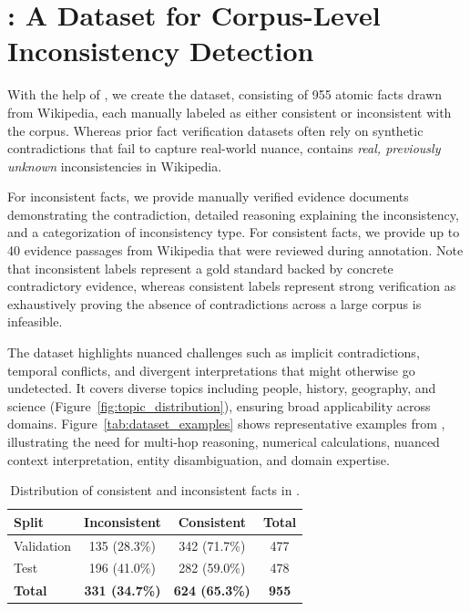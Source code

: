 \section{\dataset: A Dataset for Corpus-Level Inconsistency Detection}
\label{sec:dataset}

With the help of \system, we create the \dataset dataset, consisting of 955 atomic facts drawn from Wikipedia, each manually labeled as either consistent or inconsistent with the corpus. Whereas prior fact verification datasets often rely on synthetic contradictions that fail to capture real-world nuance, \dataset contains \emph{real, previously unknown} inconsistencies in Wikipedia.

For inconsistent facts, we provide manually verified evidence documents demonstrating the contradiction, detailed reasoning explaining the inconsistency, and a categorization of inconsistency type. For consistent facts, we provide up to 40 evidence passages from Wikipedia that were reviewed during annotation. Note that inconsistent labels represent a gold standard backed by concrete contradictory evidence, whereas consistent labels represent strong verification as exhaustively proving the absence of contradictions across a large corpus is infeasible.

The dataset highlights nuanced challenges such as implicit contradictions, temporal conflicts, and divergent interpretations that might otherwise go undetected. It covers diverse topics including people, history, geography, and science (Figure~\ref{fig:topic_distribution}), ensuring broad applicability across domains. Figure~\ref{tab:dataset_examples} shows representative examples from \dataset, illustrating the need for multi-hop reasoning, numerical calculations, nuanced context interpretation, entity disambiguation, and domain expertise.

\begin{table}[ht!]
   \centering
   \small
   \begin{tabular}{@{}lccc@{}}
      \toprule
      \textbf{Split} & \textbf{Inconsistent} & \textbf{Consistent} & \textbf{Total} \\
      \midrule
      Validation & 135 (28.3\%) & 342 (71.7\%) & 477 \\
      Test       & 196 (41.0\%) & 282 (59.0\%) & 478 \\
      \midrule
      \textbf{Total} & \textbf{331 (34.7\%)} & \textbf{624 (65.3\%)} & \textbf{955} \\
      \bottomrule
   \end{tabular}
   \caption{Distribution of consistent and inconsistent facts in \dataset.}
   \label{tab:dataset_statistics}
\vspace{-1em}
\end{table}

